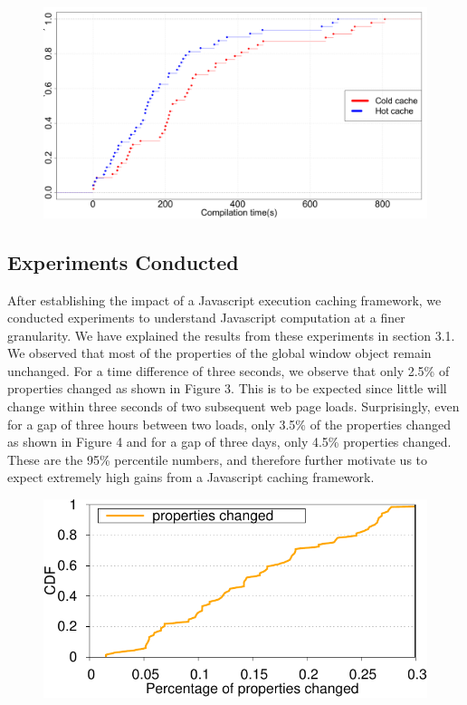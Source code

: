 \begin{figure}[t]
\centering
\includegraphics[width=0.9\columnwidth]{figs/chrome_compile.png}
\label{fig:compile_p2}
\end{figure}

\subsection{Experiments Conducted}

After establishing the impact of a Javascript execution caching framework, we conducted
experiments to understand Javascript computation at a finer granularity. We have explained the
results from these experiments in section 3.1. 
We observed that most of the properties of the global window object remain unchanged.
For a time difference of three seconds, we observe that only 2.5\% of properties
changed as shown in Figure 3. This is to be expected since little will change within three seconds 
of two subsequent web page loads. Surprisingly, even for a gap of three hours between
two loads, only 3.5\% of the properties changed as shown in Figure 4 and for a gap
 of three days, only 4.5\% 
properties changed. These are the 95\% percentile numbers, and therefore 
further motivate us to expect extremely high gains from a Javascript caching
framework. 

\begin{figure}[t]
\centering
\includegraphics[width=0.9\columnwidth]{figs/cdf_bigdata_sec_new.pdf}
\label{fig:properties-sec}
\end{figure}


